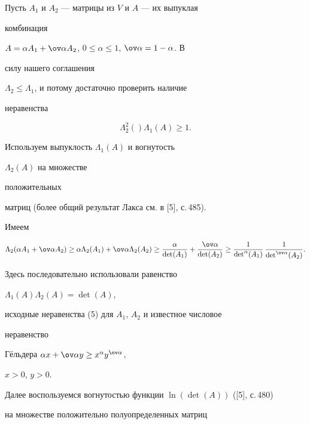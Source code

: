 \begin{pf}


Пусть $A_1$ и $A_2$ --- матрицы из $V$ и $A$ --- их выпуклая


комбинация


$A=\alpha A_1+\ov\alpha A_2$, $0\le\alpha\le 1$, $\ov\alpha=1-\alpha$. В


силу нашего соглашения


$\Lambda_2\le\Lambda_1$, и потому достаточно проверить наличие


неравенства


\begin{equation}


\Lambda^2_2()\Lambda_1(A)\ge 1.


\end{equation}





Используем выпуклость $\Lambda_1(A)$ и вогнутость


$\Lambda_2(A)$ на множестве


положительных


матриц (более общий результат Лакса см. в [5], с.\,485).


Имеем


\begin{equation}


\Lambda_2(\alpha A_1+\ov\alpha A_2)\ge\alpha\Lambda_2(A_1)


+\ov\alpha\Lambda_2(A_2)\ge


\frac{\alpha}{\det(A_1)}+\frac{\ov\alpha}{\det(A_2)}\ge


\frac{1}{\det^\alpha(A_1)}\,


\frac{1}{\det^{\ov\alpha}(A_2)}.


\end{equation}


Здесь последовательно использовали равенство


$\Lambda_1(A)\Lambda_2(A)=\det(A)$,


исходные неравенства (5) для $A_1$, $A_2$ и известное числовое


неравенство


Г\"ельдера $\alpha x+\ov\alpha y\ge x^\alpha y^{\ov\alpha}$,


$x>0$, $y>0$.





Далее воспользуемся вогнутостью функции $\ln(\det(A))$ ([5], с.\,480)


на множестве положительно полуопределенных матриц



\end{pf}
